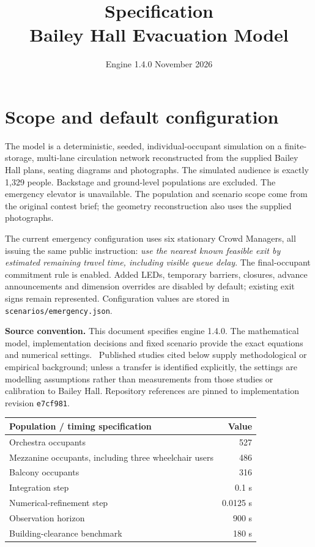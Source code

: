 \documentclass[11pt,a4paper]{article}
\title{Specification\\\large Bailey Hall Evacuation Model}
\author{}
\date{Engine 1.4.0 \quad\textbar\quad 9 November 2026}
\begin{document}
\maketitle
\vspace{-2em}

\section{Scope and default configuration}
The model is a deterministic, seeded, individual-occupant simulation on a finite-storage, multi-lane circulation network reconstructed from the supplied Bailey Hall plans, seating diagrams and photographs. The simulated audience is exactly 1,329 people. Backstage and ground-level populations are excluded. The emergency elevator is unavailable. The population and scenario scope come from the original contest brief; the geometry reconstruction also uses the supplied photographs.~\cite{brief,plans}

The current emergency configuration uses six stationary Crowd Managers, all issuing the same public instruction: \emph{use the nearest known feasible exit by estimated remaining travel time, including visible queue delay}. The final-occupant commitment rule is enabled. Added LEDs, temporary barriers, closures, advance announcements and dimension overrides are disabled by default; existing exit signs remain represented. Configuration values are stored in \texttt{scenarios/emergency.json}.

\textbf{Source convention.} This document specifies engine 1.4.0. The mathematical model, implementation decisions and fixed scenario provide the exact equations and numerical settings.~\cite{model,implementation} Published studies cited below supply methodological or empirical background; unless a transfer is identified explicitly, the settings are modelling assumptions rather than measurements from those studies or calibration to Bailey Hall. Repository references are pinned to implementation revision \texttt{e7cf981}.

\begin{center}\small
\begin{tabularx}{\linewidth}{Xr}\toprule
Population / timing specification & Value\\\midrule
Orchestra occupants & 527\\
Mezzanine occupants, including three wheelchair users & 486\\
Balcony occupants & 316\\
Integration step & 0.1 s\\
Numerical-refinement step & 0.0125 s\\
Observation horizon & 900 s\\
Building-clearance benchmark & 180 s\\\bottomrule
\end{tabularx}
\end{center}
\end{document}

